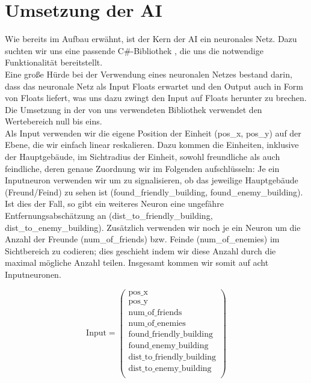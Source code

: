 \documentclass[
	12pt,
	a4paper,
	BCOR10mm,
	DIV14,
	headsepline,
	usegeometry,
]{scrreprt}
\begin{document}
\section{Umsetzung der AI}
Wie bereits im Aufbau erwähnt, ist der Kern der AI ein neuronales Netz.
Dazu suchten wir uns eine passende C\#-Bibliothek \cite{nn-bib}, die uns die notwendige Funktionalität bereitstellt.\\

Eine große Hürde bei der Verwendung eines neuronalen Netzes bestand darin, dass das neuronale Netz als Input Floats erwartet und den Output auch in Form von Floats liefert, was uns dazu zwingt den Input auf Floats herunter zu brechen.
Die Umsetzung in der von uns verwendeten Bibliothek verwendet den Wertebereich null bis eins.\\

Als Input verwenden wir die eigene Position der Einheit (pos\_x, pos\_y) auf der Ebene, die wir einfach linear reskalieren.
Dazu kommen die Einheiten, inklusive der Hauptgebäude, im Sichtradius der Einheit, sowohl freundliche als auch feindliche, deren genaue Zuordnung wir im Folgenden aufschlüsseln:
Je ein Inputneuron verwenden wir um zu signalisieren, ob das jeweilige Hauptgebäude (Freund/Feind) zu sehen ist (found\_friendly\_building, found\_enemy\_building).
Ist dies der Fall, so gibt ein weiteres Neuron eine ungefähre Entfernungsabschätzung an (dist\_to\_friendly\_building, dist\_to\_enemy\_building).
Zusätzlich verwenden wir noch je ein Neuron um die Anzahl der Freunde (num\_of\_friends) bzw. Feinde (num\_of\_enemies) im Sichtbereich zu codieren; dies geschieht indem wir diese Anzahl durch die maximal mögliche Anzahl teilen.
Insgesamt kommen wir somit auf acht Inputneuronen.

\begin{equation}
	\text{Input} = \left( \begin{matrix}
		\text{pos\_x} \\
		\text{pos\_y} \\
		\text{num\_of\_friends} \\
		\text{num\_of\_enemies} \\
		\text{found\_friendly\_building} \\
		\text{found\_enemy\_building} \\
		\text{dist\_to\_friendly\_building} \\
		\text{dist\_to\_enemy\_building} \\
	\end{matrix} \right)
\end{equation}
\end{document}
